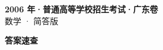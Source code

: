 \documentclass[zihao=-4, a4paper]{ctexart}
\begin{document}
\begin{center}
  {\Large\bfseries 2006 年·普通高等学校招生考试·广东卷}\\[4pt]
  {\large 数学 · 简答版}
\end{center}
\medskip
{}

\clearpage
{}
\begin{center}{\Large\bfseries 答案速查}\end{center}
\medskip

\end{document}
